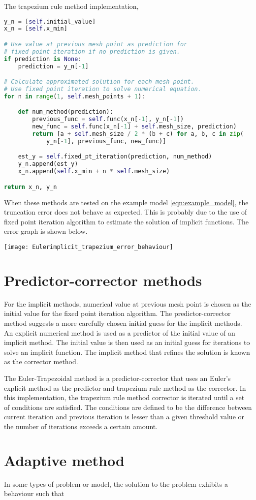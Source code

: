 The trapezium rule method implementation,
\begin{lstlisting}[language=Python]
y_n = [self.initial_value]
x_n = [self.x_min]

# Use value at previous mesh point as prediction for
# fixed point iteration if no prediction is given.
if prediction is None:
    prediction = y_n[-1]

# Calculate approximated solution for each mesh point.
# Use fixed point iteration to solve numerical equation.
for n in range(1, self.mesh_points + 1):

    def num_method(prediction):
        previous_func = self.func(x_n[-1], y_n[-1])
        new_func = self.func(x_n[-1] + self.mesh_size, prediction)
        return [a + self.mesh_size / 2 * (b + c) for a, b, c in zip(
            y_n[-1], previous_func, new_func)]

    est_y = self.fixed_pt_iteration(prediction, num_method)
    y_n.append(est_y)
    x_n.append(self.x_min + n * self.mesh_size)

return x_n, y_n
\end{lstlisting}

When these methods are tested on the example model \ref{eqn:example_model}, the truncation error does not behave as expected. This is probably due to the use of fixed point iteration algorithm to estimate the solution of implicit functions. The error graph is shown below.

\texttt{[image: Eulerimplicit\_trapezium\_error\_behaviour]}

\section{Predictor-corrector methods}
For the implicit methods, numerical value at previous mesh point is chosen as the initial value for the fixed point iteration algorithm. The predictor-corrector method suggests a more carefully chosen initial guess for the implicit methods. An explicit numerical method is used as a predictor of the initial value of an implicit method. The initial value is then used as an initial guess for iterations to solve an implicit function. The implicit method that refines the solution is known as the corrector method. 

The Euler-Trapezoidal method is a predictor-corrector that uses an Euler's explicit method as the predictor and trapezium rule method as the corrector. In this implementation, the trapezium rule method corrector is iterated until a set of conditions are satisfied. The conditions are defined to be the difference between current iteration and previous iteration is lesser than a given threshold value or the number of iterations exceeds a certain amount. 


\section{Adaptive method}
In some types of problem or model, the solution to the problem exhibits a behaviour such that 

